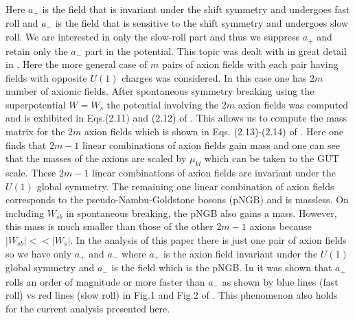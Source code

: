 \documentclass[a4paper,11pt]{article}
\begin{document}
  Here $a_+$ is the field that  is invariant under the shift symmetry and  undergoes fast roll and $a_-$ is the field that is sensitive to the shift symmetry and undergoes slow roll. We are interested in only the slow-roll part
  and thus we suppress $a_+$ and retain only the $a_-$ part in the potential. 
  This topic was dealt with in great detail in \cite{Nath:2017ihp}. Here the more general case of $m$ pairs of axion fields
  with each pair having fields with opposite $U(1)$ charges was considered.  In this case one has $2m$ number of axionic fields.
  After spontaneous symmetry breaking using the superpotential $W=W_s$ the potential involving the $2m$ axion 
  fields was computed and is exhibited in Eqs.(2.11) and (2.12) of  \cite{Nath:2017ihp}.  This allows us to compute the 
  mass matrix for the $2m$ axion fields which is shown in Eqs. (2.13)-(2.14) of  \cite{Nath:2017ihp}. Here one finds that $2m-1$ 
  linear combinations of   axion fields gain mass and one can see that the masses of the axions are scaled by $\mu_{kl}$ which can be taken to the 
  GUT scale. These $2m-1$ linear combinations of axion fields are invariant under the $U(1)$ global symmetry. The remaining one 
  linear combination of axion fields corresponds to the pseudo-Nambu-Goldstone bosons (pNGB)  and is massless. On including $W_{sb}$ in
   spontaneous breaking, the pNGB also gains a mass. However, this mass is much smaller than those of the other $2m-1$ axions 
   because $|W_{sb}| << |W_s|$. In the analysis of this paper there is just one pair of axion fields so we have only $a_+$ and $a_-$
   where $a_+$ is the axion field invariant under the $U(1)$ global symmetry and $a_-$ is the field which is the pNGB.  
   In  \cite{Nath:2017ihp} it was shown that   $a_+$ rolls an order of magnitude or more  faster than $a_-$ as shown by blue lines (fast roll) vs red lines (slow roll) in Fig.1 and Fig.2 of  \cite{Nath:2017ihp}.  This phenomenon also holds for the current analysis presented here.
\end{document}

